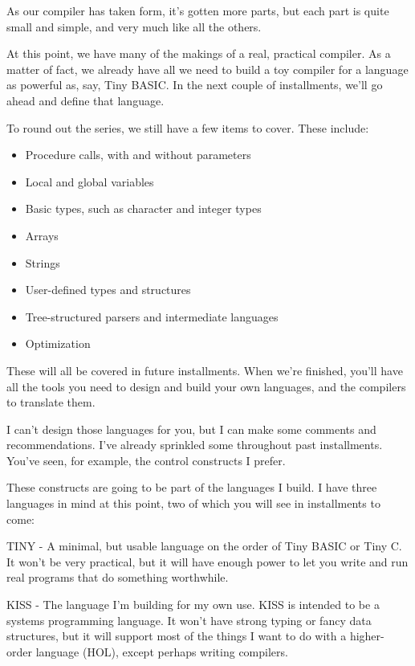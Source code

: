 As our compiler has taken form, it's gotten more parts, but each part  is  quite small and simple, and  very  much  like  all  the others.

At this point, we have many  of  the makings of a real, practical compiler. As a matter of  fact, we  already have all we need to build a toy  compiler  for  a  language as powerful as, say, Tiny BASIC. In the next couple of installments, we'll  go  ahead  and define that language.

To round out  the  series, we  still  have a few items to cover. These include:

\begin{itemize}
\item	Procedure calls, with and without parameters
\item	Local and global variables
\item	Basic types, such as character and integer types
\item	Arrays
\item	Strings
\item	User-defined types and structures
\item	Tree-structured parsers and intermediate languages
\item	Optimization
\end{itemize}

These will all be  covered  in  future  installments. When we're finished, you'll have all the tools you need to design  and build your own languages, and the compilers to translate them.

I can't  design  those  languages  for  you, but I can make some comments  and  recommendations. I've  already  sprinkled  some throughout past installments. You've  seen, for  example, the control constructs I prefer.

These constructs are going  to  be part of the languages I build. I  have  three  languages in mind at this point, two of which you will see in installments to come:

TINY - A  minimal, but  usable  language  on the order  of  Tiny BASIC or Tiny C. It won't be very practical, but  it will have enough power to let you write and  run  real programs that do something worthwhile.

KISS - The  language  I'm  building for my  own  use. KISS  is intended to be  a  systems programming language. It won't have strong typing  or  fancy data structures, but it will support most of  the  things  I  want to do with a higher- order language (HOL), except perhaps writing compilers.

